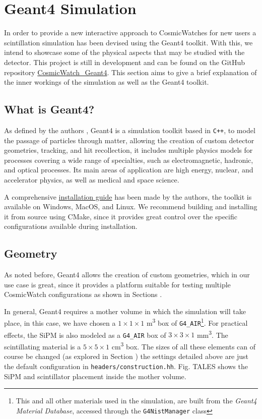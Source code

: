 \chapter{Geant4 Simulation}

In order to provide a new interactive approach to CosmicWatches for new users a scintillation simulation has been devised using the Geant4 toolkit. With this, we intend to showcase some of the physical aspects that may be studied with the detector. This project is still in development and can be found on the GitHub repository \href{https://github.com/spenceraxani/CosmicWatch_Geant4}{CosmicWatch\_Geant4}. This section aims to give a brief explanation of the inner workings of the simulation as well as the Geant4 toolkit.

\section{What is Geant4?}

As defined by the authors \cite{Geant4}, Geant4 is a simulation toolkit based in \texttt{C++}, to model the passage of particles through matter, allowing the creation of custom detector geometries, tracking, and hit recollection, it includes multiple physics models for processes covering a wide range of specialties, such as electromagnetic, hadronic, and optical processes. Its main areas of application are high energy, nuclear, and accelerator physics, as well as medical and space science.

A comprehensive \href{https://geant4-userdoc.web.cern.ch/UsersGuides/InstallationGuide/html/}{installation guide} has been made by the authors, the toolkit is available on Windows, MacOS, and Linux. We recommend building and installing it from source using CMake, since it provides great control over the specific configurations available during installation.

\section{Geometry}

As noted before, Geant4 allows the creation of custom geometries, which in our use case is great, since it provides a platform suitable for testing multiple CosmicWatch configurations as shown in Sections .

In general, Geant4 requires a mother volume in which the simulation will take place, in this case, we have chosen a $1\times1\times1$ \unit{\m\cubed} box of \texttt{G4\_AIR}\footnote{This and all other materials used in the simulation, are built from the \textit{Geant4 Material Database}, accessed through the \texttt{G4NistManager} class}. For practical effects, the SiPM is also modeled as a \texttt{G4\_AIR} box of $3\times3\times1$ \unit{\mm\cubed}. The scintillating material is a $5\times5\times1$ \unit{\cm\cubed} box. The sizes of all these elements can of course be changed (as explored in Section ) the settings detailed above are just the default configuration in \texttt{headers/construction.hh}. Fig. TALES shows the SiPM and scintillator placement inside the mother volume.

